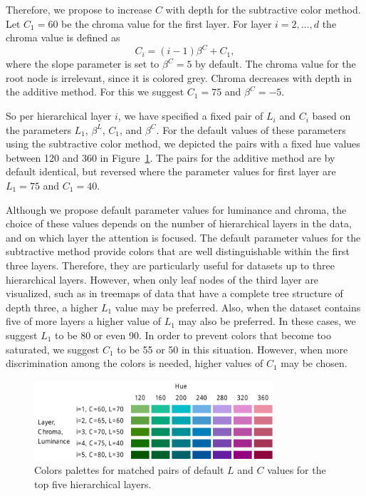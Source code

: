 \documentclass[review,journal]{vgtc}         %
\begin{document}
Therefore, we propose to increase $C$ with depth for the subtractive color method. Let $C_1=60$ be the chroma value for the first layer. For layer $i=2,\ldots, d$ the chroma value is defined as
\begin{equation}
C_i=(i-1)\beta^C + C_1,
\end{equation}
where the slope parameter is set to $\beta^C=5$ by default. The chroma value for the root node is irrelevant, since it is colored grey. Chroma decreases with depth in the additive method. For this we suggest $C_1=75$ and $\beta^C=-5$.

So per hierarchical layer $i$, we have specified a fixed pair of $L_i$ and $C_i$ based on the parameters $L_1$, $\beta^L$, $C_1$, and $\beta^C$. For the default values of these parameters using the subtractive color method, we depicted the pairs with a fixed hue values between 120 and 360 in Figure~\ref{fig:lc3}. The pairs for the additive method are by default identical, but reversed where the parameter values for first layer are $L_1=75$ and $C_1=40$.

Although we propose default parameter values for luminance and chroma, the choice of these values depends on the number of hierarchical layers in the data, and on which layer the attention is focused. The default parameter values for the subtractive method provide colors that are well distinguishable within the first three layers. Therefore, they are particularly useful for datasets up to three hierarchical layers. However, when only leaf nodes of the third layer are visualized, such as in treemaps of data that have a complete tree structure of depth three, a higher $L_1$ value may be preferred. Also, when the dataset contains five of more layers a higher value of $L_1$ may also be preferred. In these cases, we suggest $L_1$ to be 80 or even 90. In order to prevent colors that become too saturated, we suggest $C_1$ to be 55 or 50 in this situation. However, when more discrimination among the colors is needed, higher values of $C_1$ may be chosen.

\begin{figure}[!t]
  \centering
  \includegraphics[width=3.5in]{LC3.pdf}
  \caption{Colors palettes for matched pairs of default $L$ and $C$ values for the top five hierarchical layers.}\label{fig:lc3}
\end{figure}
\end{document}
